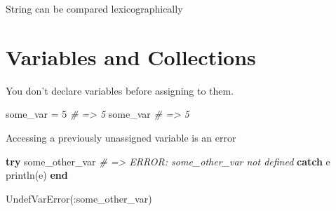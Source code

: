 \documentclass[ignorenonframetext,]{beamer}
\newenvironment{Shaded}{}{}
\newcommand{\KeywordTok}[1]{\textcolor[rgb]{0.00,0.44,0.13}{\textbf{{#1}}}}
\newcommand{\FloatTok}[1]{\textcolor[rgb]{0.25,0.63,0.44}{{#1}}}
\newcommand{\StringTok}[1]{\textcolor[rgb]{0.25,0.44,0.63}{{#1}}}
\newcommand{\CommentTok}[1]{\textcolor[rgb]{0.38,0.63,0.69}{\textit{{#1}}}}
\newcommand{\NormalTok}[1]{{#1}}
\begin{document}
\begin{frame}[fragile]{String can be compared lexicographically}

\begin{Shaded}
\end{Shaded}

\end{frame}

\section{Variables and Collections}\label{variables-and-collections}

\begin{frame}[fragile]{You don't declare variables before assigning to
them.}

\begin{Shaded}
\begin{Highlighting}[]
\NormalTok{some_var = }\FloatTok{5} \CommentTok{# => 5}
\NormalTok{some_var }\CommentTok{# => 5}
\end{Highlighting}
\end{Shaded}

\end{frame}

\begin{frame}[fragile]{Accessing a previously unassigned variable is an
error}

\begin{Shaded}
\begin{Highlighting}[]
\KeywordTok{try}
    \NormalTok{some_other_var }\CommentTok{# => ERROR: some_other_var not defined}
\KeywordTok{catch} \NormalTok{e}
    \NormalTok{println(e)}
\KeywordTok{end}
\end{Highlighting}
\end{Shaded}

\begin{Shaded}
\begin{Highlighting}[]
\NormalTok{UndefVarError(:some_other_var)}
\end{Highlighting}
\end{Shaded}

\end{frame}
\end{document}
